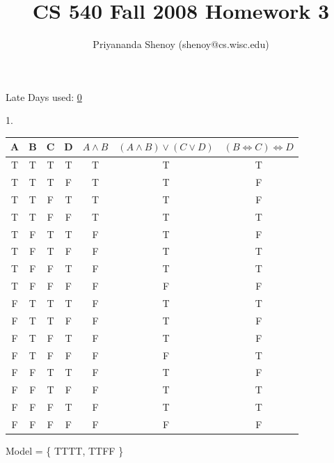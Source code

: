 \documentclass[11pt]{article}
\author{Priyananda Shenoy (shenoy@cs.wisc.edu)}
\title{
	CS 540 Fall 2008 Homework 3
}
\renewcommand{\iff}{\Leftrightarrow}
\begin{document}
\maketitle
\begin{center}
	Late Days used: \underline{0}
\end{center}
\newpage

\newcommand{\bt}{\textbf{T}}

1. \\
{\center
\begin{tabular}{|c|c|c|c|c|c|c|}
	\hline
	A & B & C & D & $A \land B$ & $(A \land B) \lor (C \lor D)$ & $(B \iff C) \iff D$\\
	\hline
	\rowcolor{CommentColor}
	T & T & T & T & T           & T                             & T\\
	T & T & T & F & T           & T                             & F\\
	T & T & F & T & T           & T                             & F\\
	\rowcolor{CommentColor}
	T & T & F & F & T           & T                             & T\\
	T & F & T & T & F           & T                             & F\\
	T & F & T & F & F           & T                             & T\\
	T & F & F & T & F           & T                             & T\\
	T & F & F & F & F           & F                             & F\\
	F & T & T & T & F           & T                             & T\\
	F & T & T & F & F           & T                             & F\\
	F & T & F & T & F           & T                             & F\\
	F & T & F & F & F           & F                             & T\\
	F & F & T & T & F           & T                             & F\\
	F & F & T & F & F           & T                             & T\\
	F & F & F & T & F           & T                             & T\\
	F & F & F & F & F           & F                             & F\\
	\hline
\end{tabular}

Model = \{ TTTT, TTFF \} \\
}
\end{document}
